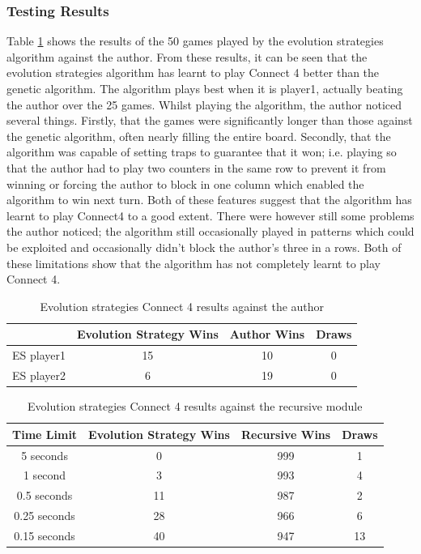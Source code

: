 \subsubsection{Testing Results}
Table \ref{tab:esme} shows the results of the 50 games  played by the evolution strategies algorithm against the author. From these results, it can be seen that the evolution strategies algorithm has learnt to play Connect 4 better than the genetic algorithm. The algorithm plays best when it is player1, actually beating the author over the 25 games. Whilst playing the algorithm, the author noticed several things. Firstly, that the games were significantly longer than those against the genetic algorithm, often nearly filling the entire board. Secondly, that the algorithm was capable of setting traps to guarantee that it won; i.e. playing so that the author had to play two counters in the same row to prevent it from winning or forcing the author to block in one column which enabled the algorithm to win next turn. Both of these features suggest that the algorithm has learnt to play Connect4 to a good extent. There were however still some problems the author noticed; the algorithm still occasionally played in patterns which could be exploited and occasionally didn't block the author's three in a rows. Both of these limitations show that the algorithm has not completely learnt to play Connect 4.
\begin{table}[tp]
   \begin{minipage}{\textwidth}
      \begin{center}
         \begin{tabular}{c|c|c|c}
           & Evolution Strategy Wins & Author Wins & Draws\\
           \hline
           ES player1 & 15 & 10 & 0 \\
           ES player2 & 6 & 19 & 0
         \end{tabular}
      \end{center}
   \end{minipage}
   \caption{Evolution strategies Connect 4 results against the author}
   \label{tab:esme}
\end{table}
\begin{table}[tp]
   \begin{minipage}{\textwidth}
      \begin{center}
         \begin{tabular}{c|c|c|c}
           Time Limit & Evolution Strategy Wins & Recursive Wins & Draws\\
           \hline
           5 seconds & 0 & 999 & 1 \\
           1 second & 3 & 993 & 4 \\
           0.5 seconds & 11 & 987 & 2 \\
           0.25 seconds & 28 & 966 & 6 \\
           0.15 seconds & 40 & 947 & 13
         \end{tabular}
      \end{center}
   \end{minipage}
   \caption{Evolution strategies Connect 4 results against the recursive module}
   \label{tab:esre}
\end{table}
